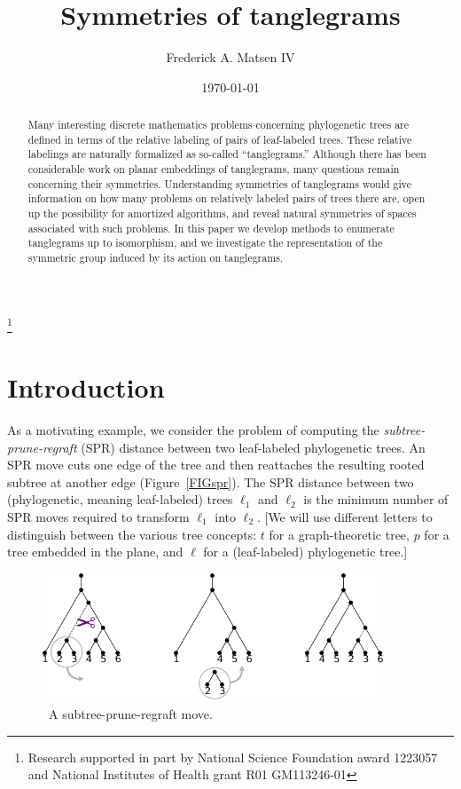 \documentclass{amsart}
\newcommand{\arxiv}[1]{#1}
\newcommand{\FIGspr}{\
\label{FIGspr}
\begin{figure}
  \arxiv{\includegraphics[width=4in]{figures/spr-definition}}
\caption{\
  A subtree-prune-regraft move.
}
\end{figure}
}
\begin{document}
\title{Symmetries of tanglegrams}
\author[Matsen]{Frederick A. Matsen IV}
\address{Fred Hutchinson Cancer Research Center \\ Seattle, WA}
\thanks{Research supported in part by National Science Foundation award 1223057 and National Institutes of Health grant R01 GM113246-01}


\date{\today}

\begin{abstract}
Many interesting discrete mathematics problems concerning phylogenetic trees are defined in terms of the relative labeling of pairs of leaf-labeled trees.
These relative labelings are naturally formalized as so-called ``tanglegrams.''
Although there has been considerable work on planar embeddings of tanglegrams, many questions remain concerning their symmetries.
Understanding symmetries of tanglegrams would give information on how many problems on relatively labeled pairs of trees there are, open up the possibility for amortized algorithms, and reveal natural symmetries of spaces associated with such problems.
In this paper we develop methods to enumerate tanglegrams up to isomorphism, and we investigate the representation of the symmetric group induced by its action on tanglegrams.
\end{abstract}

\maketitle


\section{Introduction}
As a motivating example, we consider the problem of computing the \emph{subtree-prune-regraft} (SPR) distance between two leaf-labeled phylogenetic trees.
An SPR move cuts one edge of the tree and then reattaches the resulting rooted subtree at another edge (Figure~\ref{FIGspr}).
The SPR distance between two (phylogenetic, meaning leaf-labeled) trees $\ell_1$ and $\ell_2$ is the minimum number of SPR moves required to transform $\ell_1$ into $\ell_2$.
[We will use different letters to distinguish between the various tree concepts: $t$ for a graph-theoretic tree, $p$ for a tree embedded in the plane, and $\ell$ for a (leaf-labeled) phylogenetic tree.]
\FIGspr
\end{document}
